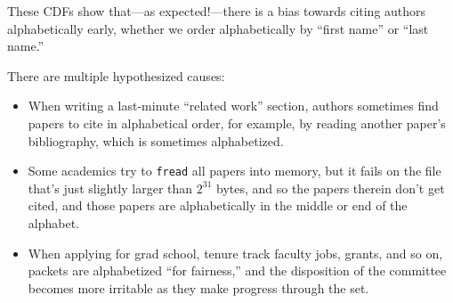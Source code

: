 \documentclass[twocolumn]{article}
\begin{document}
These CDFs show that---as expected!---there is a bias towards citing
authors alphabetically early, whether we order alphabetically by
``first name'' or ``last name.''

There are multiple hypothesized causes:
\begin{itemize}

\item When writing a last-minute ``related work'' section, authors
  sometimes find papers to cite in alphabetical order, for example, by
  reading another paper's bibliography, which is sometimes
  alphabetized.

\item Some academics try to \verb+fread+ all papers into memory, but
  it fails on the file that's just slightly larger than $2^{31}$ bytes,
  and so the papers therein don't get cited, and those papers are
  alphabetically in the middle or end of the alphabet.

\item When applying for grad school, tenure track faculty jobs, grants,
  and so on, packets are alphabetized ``for fairness,'' and the
  disposition of the committee becomes more irritable as they make
  progress through the set.
  
\end{itemize}
  
% 
\end{document}
